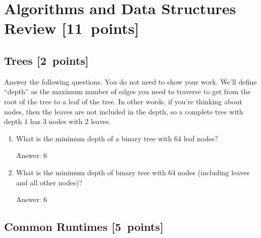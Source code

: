 \documentclass{article}
\newcommand{\blu}[1]{{\textcolor{blu}{#1}}}
\newenvironment{answer}{\par\begingroup\color{gre}Answer: }{\endgroup}
\let\ask\blu
\newcommand\pts[1]{\textcolor{pointscolour}{[#1~points]}}
\begin{document}
  \clearpage
  \section{Algorithms and Data Structures Review \pts{11}}

  \subsection{Trees \pts{2}}

  \ask{Answer the following questions.} You do not need to show your work. We'll define ``depth'' as the maximum number of edges you need to traverse to get from the root of the tree to a leaf of the tree. In other words, if you're thinking about nodes, then the leaves are not included in the depth, so a complete tree with depth $1$ has 3 nodes with 2 leaves.


  \begin{enumerate}
  \item What is the minimum depth of a binary tree with 64 leaf nodes?
  \begin{answer}
    6
  \end{answer}
  \item What is the minimum depth of binary tree with 64 nodes (including leaves and all other nodes)?
  \begin{answer}
    6
  \end{answer}
  \end{enumerate}

  \subsection{Common Runtimes \pts{5}}
\end{document}
